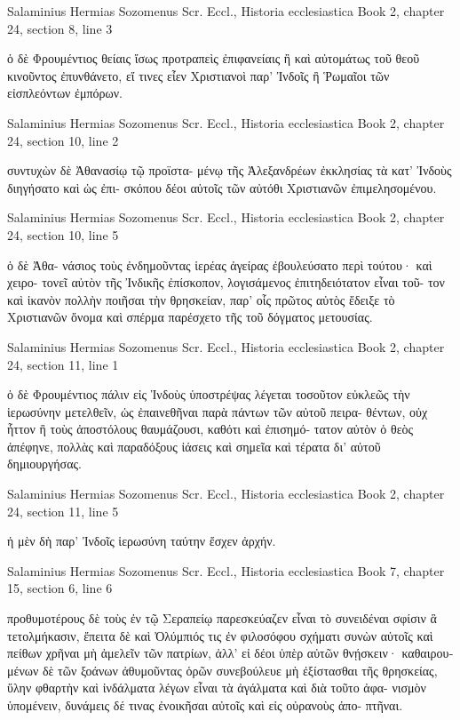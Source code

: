 \documentclass[12pt,letterpaper,twoside,final]{memoir}
\begin{document}
\begin{greek}
Salaminius Hermias Sozomenus Scr. Eccl., Historia ecclesiastica 
Book 2, chapter 24, section 8, line 3

                    ὁ δὲ Φρουμέντιος θείαις ἴσως προτραπεὶς ἐπιφανείαις 
ἢ καὶ αὐτομάτως τοῦ θεοῦ κινοῦντος ἐπυνθάνετο, εἴ τινες εἶεν Χριστιανοὶ 
παρ' Ἰνδοῖς ἢ Ῥωμαῖοι τῶν εἰσπλεόντων ἐμπόρων. 



Salaminius Hermias Sozomenus Scr. Eccl., Historia ecclesiastica 
Book 2, chapter 24, section 10, line 2

                                         συντυχὼν δὲ Ἀθανασίῳ τῷ προϊστα-
μένῳ τῆς Ἀλεξανδρέων ἐκκλησίας τὰ κατ' Ἰνδοὺς διηγήσατο καὶ ὡς ἐπι-
σκόπου δέοι αὐτοῖς τῶν αὐτόθι Χριστιανῶν ἐπιμελησομένου. 



Salaminius Hermias Sozomenus Scr. Eccl., Historia ecclesiastica 
Book 2, chapter 24, section 10, line 5

                                                                    ὁ δὲ Ἀθα-
νάσιος τοὺς ἐνδημοῦντας ἱερέας ἀγείρας ἐβουλεύσατο περὶ τούτου· καὶ χειρο-
τονεῖ αὐτὸν τῆς Ἰνδικῆς ἐπίσκοπον, λογισάμενος ἐπιτηδειότατον εἶναι τοῦ-
τον καὶ ἱκανὸν πολλὴν ποιῆσαι τὴν θρησκείαν, παρ' οἷς πρῶτος αὐτὸς ἔδειξε 
τὸ Χριστιανῶν ὄνομα καὶ σπέρμα παρέσχετο τῆς τοῦ δόγματος μετουσίας. 



Salaminius Hermias Sozomenus Scr. Eccl., Historia ecclesiastica 
Book 2, chapter 24, section 11, line 1

ὁ δὲ Φρουμέντιος πάλιν εἰς Ἰνδοὺς ὑποστρέψας λέγεται τοσοῦτον εὐκλεῶς 
τὴν ἱερωσύνην μετελθεῖν, ὡς ἐπαινεθῆναι παρὰ πάντων τῶν αὐτοῦ πειρα-  
θέντων, οὐχ ἧττον ἢ τοὺς ἀποστόλους θαυμάζουσι, καθότι καὶ ἐπισημό-
τατον αὐτὸν ὁ θεὸς ἀπέφηνε, πολλὰς καὶ παραδόξους ἰάσεις καὶ σημεῖα καὶ 
τέρατα δι' αὐτοῦ δημιουργήσας. 



Salaminius Hermias Sozomenus Scr. Eccl., Historia ecclesiastica 
Book 2, chapter 24, section 11, line 5

                                   ἡ μὲν δὴ παρ' Ἰνδοῖς ἱερωσύνη ταύτην 
ἔσχεν ἀρχήν. 



Salaminius Hermias Sozomenus Scr. Eccl., Historia ecclesiastica 
Book 7, chapter 15, section 6, line 6

                                   προθυμοτέρους δὲ τοὺς ἐν τῷ Σεραπείῳ 
παρεσκεύαζεν εἶναι τὸ συνειδέναι σφίσιν ἃ τετολμήκασιν, ἔπειτα δὲ καὶ 
Ὀλύμπιός τις ἐν φιλοσόφου σχήματι συνὼν αὐτοῖς καὶ πείθων χρῆναι μὴ 
ἀμελεῖν τῶν πατρίων, ἀλλ' εἰ δέοι ὑπὲρ αὐτῶν θνῄσκειν· καθαιρουμένων 
δὲ τῶν ξοάνων ἀθυμοῦντας ὁρῶν συνεβούλευε μὴ ἐξίστασθαι τῆς θρησκείας, 
ὕλην φθαρτὴν καὶ ἰνδάλματα λέγων εἶναι τὰ ἀγάλματα καὶ διὰ τοῦτο ἀφα-
νισμὸν ὑπομένειν, δυνάμεις δέ τινας ἐνοικῆσαι αὐτοῖς καὶ εἰς οὐρανοὺς ἀπο-
πτῆναι. 




\end{greek}
\end{document}
